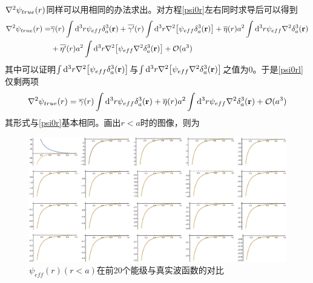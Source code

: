 \documentclass[hyperref,cs4size,titlepage]{ctexart}
\begin{document}
$\laplacian{\psi_{true}(r)}$同样可以用相同的办法求出。对方程\eqref{psi0r}左右同时求导后可以得到
\begin{alignat}{1}\label{psi0rl}
  \laplacian{\psi_{true}(r)}=&\overline{\gamma}(r)\int\dd^3r\psi_{eff}\delta^3_a(\vb{r})+\overline{\gamma'}(r)\int\dd^3r\laplacian{\bqty{\psi_{eff}\delta^3_a(\vb{r})}}+\overline{\eta}(r)a^2\int\dd^3r\psi_{eff}\laplacian{\delta^3_a(\vb{r})}
 \nonumber\\&+\overline{\eta'}(r)a^2\int\dd^3r\laplacian{\bqty{\psi_{eff}\laplacian{\delta^3_a(\vb{r})}}}+\mathcal{O}(a^3)
\end{alignat}
其中可以证明$\int\dd^3r\laplacian{\bqty{\psi_{eff}\delta^3_a(\vb{r})}}$与$\int\dd^3r\laplacian{\bqty{\psi_{eff}\laplacian{\delta^3_a(\vb{r})}}}$之值为0。于是\eqref{psi0rl}仅剩两项
\begin{equation}\label{psi0rl2}
  \laplacian{\psi_{true}(r)}=\overline{\gamma}(r)\int\dd^3r\psi_{eff}\delta^3_a(\vb{r})+\overline{\eta}(r)a^2\int\dd^3r\psi_{eff}\laplacian{\delta^3_a(\vb{r})}+\mathcal{O}(a^3)
\end{equation}
其形式与\eqref{psi0r}基本相同。画出$r<a$时的图像，则为
\begin{figure}[!htbp]
  \centering
  \includegraphics[width=6in]{psirlap.eps}
  \caption{$\psi_{eff}(r)(r<a)$在前20个能级与真实波函数的对比}
\end{figure}
\clearpage
\end{document}
